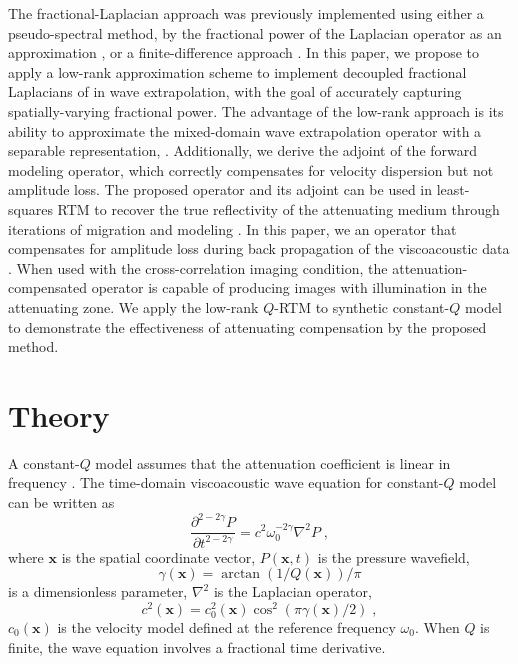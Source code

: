 The fractional-Laplacian approach was previously implemented using either a pseudo-spectral method, by  the fractional power of the Laplacian operator as an approximation \cite[]{zhu14a}, or a finite-difference approach \cite[]{lin09}. In this paper, we propose to apply a low-rank approximation scheme \cite[]{lowrank,myself1} to implement decoupled fractional Laplacians of \cite{zhu14a} in wave extrapolation, with the goal of accurately capturing spatially-varying fractional power. The advantage of the low-rank approach is its ability to approximate the mixed-domain wave extrapolation operator with a separable representation, . Additionally, we derive the adjoint of the forward modeling operator, which correctly compensates for velocity dispersion but not amplitude loss. The proposed operator and its adjoint can be used in least-squares RTM to recover the true reflectivity of the attenuating medium through iterations of migration and modeling \cite[]{me14a}. In this paper, we  an operator that compensates for amplitude loss during back propagation of the viscoacoustic data \cite[]{zhu14b}. When used with the cross-correlation imaging condition, the attenuation-compensated operator is capable of producing images with  illumination in the attenuating zone. We apply the low-rank $Q$-RTM to synthetic constant-$Q$ model to demonstrate the effectiveness of attenuating compensation by the proposed method.

\section{Theory}
A constant-$Q$ model assumes that the attenuation coefficient is linear in frequency \cite[]{kja79}. 
The time-domain viscoacoustic wave equation for constant-$Q$ model can be written as \cite[]{carc02}
\begin{equation}
 \label{eq:caputo}
 \frac{\partial^{2-2\gamma} P}{\partial t^{2-2\gamma}} = c^2\omega_0^{-2\gamma}\nabla^2 P \;,
\end{equation}
where $\mathbf{x}$ is the spatial coordinate vector, $P(\mathbf{x},t)$ is the pressure wavefield, 
\begin{equation}
\gamma(\mathbf{x})=\arctan(1/Q(\mathbf{x}))/\pi
\end{equation}
is a dimensionless parameter, $\nabla^2$ is the Laplacian operator,
\begin{equation}
c^2(\mathbf{x})=c_0^2(\mathbf{x})\cos^2(\pi\gamma(\mathbf{x})/2) \; ,
\end{equation}
 $c_0(\mathbf{x})$ is the velocity model defined at the reference frequency $\omega_0$. When $Q$ is finite, the wave equation involves a fractional time derivative. 

